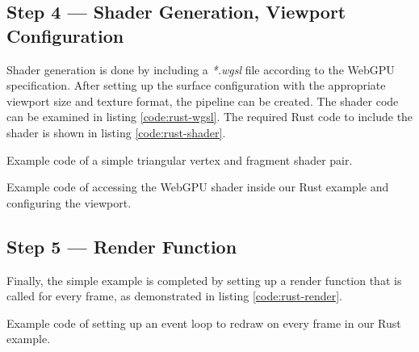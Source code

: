 
\subsection{Step 4 --- Shader Generation, Viewport Configuration}
Shader generation is done by including a \emph{*.wgsl} file according to the WebGPU specification.
After setting up the surface configuration with the appropriate viewport size and texture format,
the pipeline can be created. The shader code can be examined in listing \ref{code:rust-wgsl}.
The required Rust code to include the shader is shown in listing \ref{code:rust-shader}.


\begin{listing}
  \centering

  \caption[Code Snippet: WGSL Shader Code]
  {
    Example code of a simple triangular vertex and fragment shader pair.
  }
  \label{code:rust-wgsl}
\end{listing}


\begin{listing}
  \centering

  \caption[Code Snippet: Shader and Viewport Setup]
  {
    Example code of accessing the WebGPU shader inside our Rust example and configuring the viewport.
  }
  \label{code:rust-shader}
\end{listing}



\subsection{Step 5 --- Render Function}
Finally, the simple example is completed by setting up a render function that is called for every frame,
as demonstrated in listing \ref{code:rust-render}.

\begin{listing}
  \centering

  \caption[Code Snippet: Event Loop Setup]
  {
    Example code of setting up an event loop to redraw on every frame in our Rust example.
  }
  \label{code:rust-render}
\end{listing}

